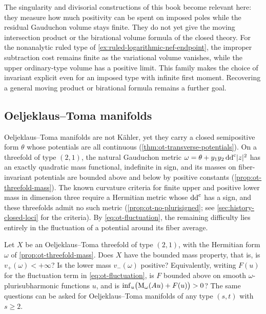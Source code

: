 The singularity and divisorial constructions of this book become relevant here: they measure how much positivity can be spent on imposed poles while the residual Gauduchon volume stays finite. They do not yet give the moving intersection product or the birational volume formula of the closed theory. For the nonanalytic ruled type of \cref{ex:ruled-logarithmic-nef-endpoint}, the improper subtraction cost remains finite as the variational volume vanishes, while the upper ordinary-type volume has a positive limit. This family makes the choice of invariant explicit even for an imposed type with infinite first moment. Recovering a general moving product or birational formula remains a further goal.

\subsection{Oeljeklaus--Toma manifolds}
\label{subsec:ot-problems}

Oeljeklaus--Toma manifolds are not K\"ahler, yet they carry a closed semipositive form $\theta$ whose potentials are all continuous (\cref{thm:ot-transverse-potentials}). On a threefold of type $(2,1)$, the natural Gauduchon metric $\omega=\theta+y_1y_2\,\mathrm{dd}^{\mathrm{c}}|z|^2$ has an exactly quadratic mass functional, indefinite in sign, and its masses on fiber-invariant potentials are bounded above and below by positive constants (\cref{prop:ot-threefold-mass}). The known curvature criteria for finite upper and positive lower mass in dimension three require a Hermitian metric whose $\mathrm{dd}^{\mathrm{c}}$ has a sign, and these threefolds admit no such metric (\cref{prop:ot-no-plurisigned}; see \cref{sec:history-closed-loci} for the criteria). By \eqref{eq:ot-fluctuation}, the remaining difficulty lies entirely in the fluctuation of a potential around its fiber average.

\begin{problem}\label{qu:ot-bounded-mass}
Let $X$ be an Oeljeklaus--Toma threefold of type $(2,1)$, with the Hermitian form $\omega$ of \cref{prop:ot-threefold-mass}. Does $X$ have the bounded mass property, that is, is $v_+(\omega)<+\infty$? Is the lower mass $v_-(\omega)$ positive? Equivalently, writing $F(u)$ for the fluctuation term in \eqref{eq:ot-fluctuation}, is $F$ bounded above on smooth $\omega$-plurisubharmonic functions $u$, and is $\inf_u\bigl(\mathrm M_\omega(Au)+F(u)\bigr)>0$? The same questions can be asked for Oeljeklaus--Toma manifolds of any type $(s,t)$ with $s\geq2$.
\end{problem}

